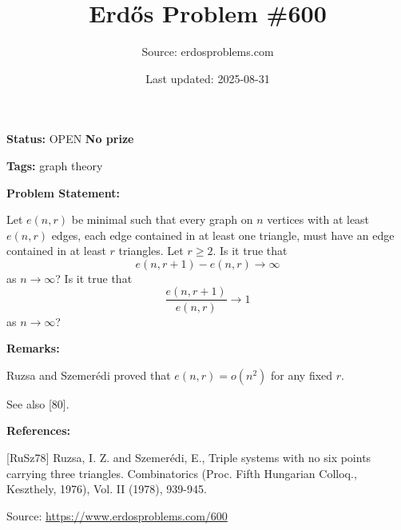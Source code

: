 \documentclass{article}
\title{Erd\H{o}s Problem \#600}
\date{Last updated: 2025-08-31}
\author{Source: erdosproblems.com}
\begin{document}
\maketitle

\noindent\textbf{Status:} OPEN \quad \textbf{No prize}

\noindent\textbf{Tags:} graph theory

\medskip
\noindent\textbf{Problem Statement:}

Let $e(n,r)$ be minimal such that every graph on $n$ vertices with at least $e(n,r)$ edges, each edge contained in at least one triangle, must have an edge contained in at least $r$ triangles. Let $r\geq 2$. Is it true that\[e(n,r+1)-e(n,r)\to \infty\]as $n\to \infty$? Is it true that\[\frac{e(n,r+1)}{e(n,r)}\to 1\]as $n\to \infty$?

\bigskip
\noindent\textbf{Remarks:}

Ruzsa and Szemer\'{e}di \cite{RuSz78} proved that $e(n,r)=o(n^2)$ for any fixed $r$.

See also [80].

\bigskip
\noindent\textbf{References:}

[RuSz78] Ruzsa, I. Z. and Szemer\'{e}di, E., Triple systems with no six points carrying three triangles. Combinatorics (Proc. Fifth Hungarian Colloq.,
Keszthely, 1976), Vol. II (1978), 939-945.

\bigskip
\noindent\small{Source: \url{https://www.erdosproblems.com/600}}
\end{document}
